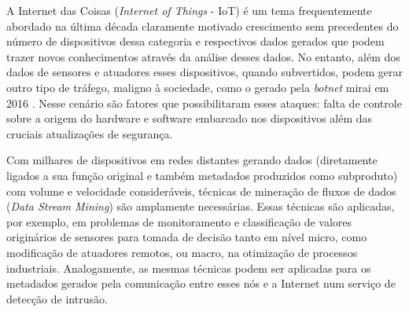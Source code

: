 

% 
% 


A Internet das Coisas (\emph{Internet of Things} - IoT) é um tema frequentemente
abordado na última década claramente motivado crescimento sem precedentes do
número de dispositivos dessa categoria e respectivos dados gerados que podem
trazer novos conhecimentos através da análise desses dados. No entanto, além dos
dados de sensores e atuadores esses dispositivos, quando subvertidos, podem
gerar outro tipo de tráfego, maligno à sociedade, como o gerado pela
\emph{botnet} mirai em 2016 \cite{Kambourakis2017}. Nesse cenário são fatores
que possibilitaram esses ataques: falta de controle sobre a origem do hardware e
software embarcado nos dispositivos além das cruciais atualizações de segurança.

Com milhares de dispositivos em redes distantes gerando dados (diretamente
ligados a sua função original e também metadados produzidos como subproduto) com
volume e velocidade consideráveis, técnicas de mineração de fluxos de dados
(\emph{Data Stream Mining}) são amplamente necessárias. Essas técnicas são
aplicadas, por exemplo, em problemas de monitoramento e classificação de valores
originários de sensores para tomada de decisão tanto em nível micro, como
modificação de atuadores remotos, ou macro, na otimização de processos
industriais. Analogamente, as mesmas técnicas podem ser aplicadas para os
metadados gerados pela comunicação entre esses nós e a Internet num serviço de
detecção de intrusão.

